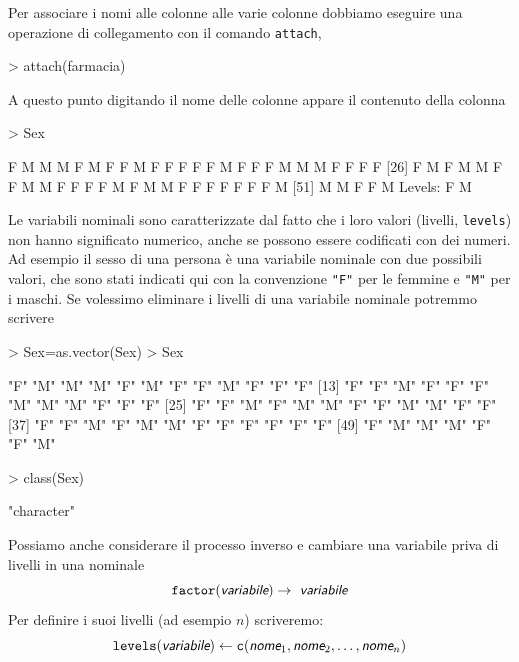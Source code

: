 \documentclass[onecolumn,11pt]{book}
\newcommand{\varia}[1]{\textsl{\textsf{#1}}}
\begin{document}
Per associare i nomi alle colonne  alle varie colonne dobbiamo eseguire una operazione di collegamento con il comando \texttt{attach}, 
\begin{Schunk}
\begin{Sinput}
> attach(farmacia)
\end{Sinput}
\end{Schunk}
A questo punto digitando il nome delle colonne appare il contenuto della colonna
\begin{Schunk}
\begin{Sinput}
> Sex
\end{Sinput}
\begin{Soutput}
 [1] F M M M F M F F M F F F F F M F F F M M M F F F F
[26] F M F M M F F M M F F F F M F M M F F F F F F F M
[51] M M F F M
Levels: F M
\end{Soutput}
\end{Schunk}
Le variabili nominali sono caratterizzate dal fatto che i loro valori (livelli, \texttt{levels})  non hanno significato numerico, anche se possono essere codificati con dei numeri.   Ad esempio il sesso di una persona \`e una variabile nominale con due possibili valori, che sono stati  indicati qui con la convenzione  \texttt{"F"}  per le femmine e \texttt{"M"} per i maschi.  Se volessimo eliminare i livelli di una variabile nominale potremmo scrivere
\begin{Schunk}
\begin{Sinput}
> Sex=as.vector(Sex)
> Sex
\end{Sinput}
\begin{Soutput}
 [1] "F" "M" "M" "M" "F" "M" "F" "F" "M" "F" "F" "F"
[13] "F" "F" "M" "F" "F" "F" "M" "M" "M" "F" "F" "F"
[25] "F" "F" "M" "F" "M" "M" "F" "F" "M" "M" "F" "F"
[37] "F" "F" "M" "F" "M" "M" "F" "F" "F" "F" "F" "F"
[49] "F" "M" "M" "M" "F" "F" "M"
\end{Soutput}
\begin{Sinput}
> class(Sex)
\end{Sinput}
\begin{Soutput}
[1] "character"
\end{Soutput}
\end{Schunk}
Possiamo anche considerare il processo inverso e cambiare una variabile priva di livelli in una nominale 
$$\texttt{factor}(\varia{variabile})\rightarrow\varia{ variabile}$$
Per definire i suoi livelli (ad esempio $n$) scriveremo:
$$\texttt{levels}(\varia{variabile})\leftarrow\texttt{c}(\varia{nome}_1,\varia{nome}_2,\ldots,\varia{nome}_n)$$
\end{document}
